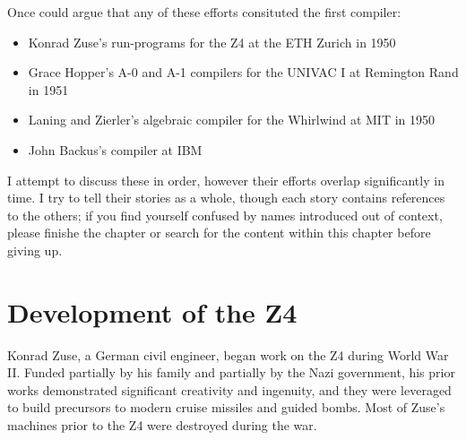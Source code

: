 \bigskip

Once could argue that any of these efforts consituted the first compiler:
\begin{itemize}
    \item Konrad Zuse's run-programs for the Z4 at the ETH Zurich in 1950
    \item Grace Hopper's A-0 and A-1 compilers for the UNIVAC I at Remington Rand in 1951
    \item Laning and Zierler's algebraic compiler for the Whirlwind at MIT in 1950
    \item John Backus's \FTNI{} compiler at IBM
\end{itemize}

I attempt to discuss these in order, however their efforts overlap significantly in time.
I try to tell their stories as a whole, though each story contains references to the others;
if you find yourself confused by names introduced out of context, please finishe the chapter
or search for the content within this chapter before giving up.

\section{Development of the Z4}

Konrad Zuse, a German civil engineer, began work on the Z4 during World War II.
Funded partially by his family and partially by the Nazi government, his prior works
demonstrated significant creativity and ingenuity, and they were leveraged to build
precursors to modern cruise missiles and guided bombs.
Most of Zuse's machines prior to the Z4 were destroyed during the war.


